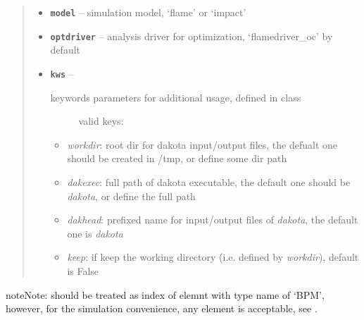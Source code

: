 \documentclass[letterpaper,10pt,english]{sphinxmanual}
\begin{document}
\begin{fulllineitems}
\begin{quote}
\begin{description}
\begin{itemize}
\begin{enumerate}
\end{enumerate}


\item {} 
\textbf{\texttt{model}} -- simulation model, `flame' or `impact'

\item {} 
\textbf{\texttt{optdriver}} -- analysis driver for optimization, `flamedriver\_oc' by default

\item {} 
\textbf{\texttt{kws}} -- \begin{description}
\item[{keywords parameters for additional usage, defined in  class}] \leavevmode
valid keys:

\end{description}
\begin{itemize}
\item {} 
\emph{workdir}: root dir for dakota input/output files,
the defualt one should be created in /tmp, or define some dir path

\item {} 
\emph{dakexec}: full path of dakota executable,
the default one should be \emph{dakota}, or define the full path

\item {} 
\emph{dakhead}: prefixed name for input/output files of \emph{dakota}, 
the default one is \emph{dakota}

\item {} 
\emph{keep}: if keep the working directory (i.e. defined by \emph{workdir}), 
default is False

\end{itemize}


\end{itemize}

\end{description}\end{quote}

\begin{notice}{note}{Note:}
 should be treated as index of elemnt with type name of `BPM',
however, for the simulation convenience, any element is acceptable, see {\hyperref[src/apidocs/genopt:genopt.DakotaOC.set_bpms]{}}.
\end{notice}

\begin{fulllineitems}
\label{src/apidocs/genopt:genopt.DakotaOC.bpms}
\end{fulllineitems}


\end{fulllineitems}
\end{document}
